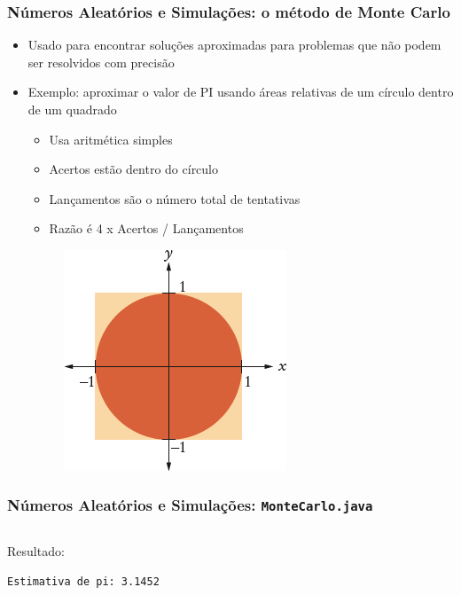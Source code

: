 \documentclass[xcolor={dvipsnames,table},aspectratio=169]{beamer}
\begin{document}
\begin{frame}\frametitle{Números Aleatórios e Simulações: o método de Monte Carlo}
\begin{itemize}
	\item Usado para encontrar soluções aproximadas para problemas que não podem ser resolvidos com precisão
	\item Exemplo: aproximar o valor de PI usando áreas relativas de um círculo dentro de um quadrado
	\begin{itemize}
		\item Usa aritmética simples
		\item Acertos estão dentro do círculo
		\item Lançamentos são o número total de tentativas
		\item Razão é 4 x Acertos / Lançamentos
	\end{itemize}
\begin{figure}[h]
	\includegraphics[height=0.2\paperheight,center]{pucrs-ep-fprog-unidade_04-lacos-laminas-monte_carlo.png}
\end{figure}
\end{itemize}
\end{frame}

\begin{frame}[fragile]\frametitle{Números Aleatórios e Simulações: \texttt{MonteCarlo.java}}
\tiny{\inputminted[bgcolor=cyan!10]{java}{src/MonteCarlo.java}}
{\tiny
Resultado:
\begin{verbatim}
Estimativa de pi: 3.1452	
\end{verbatim}
}
\end{frame}
\end{document}
